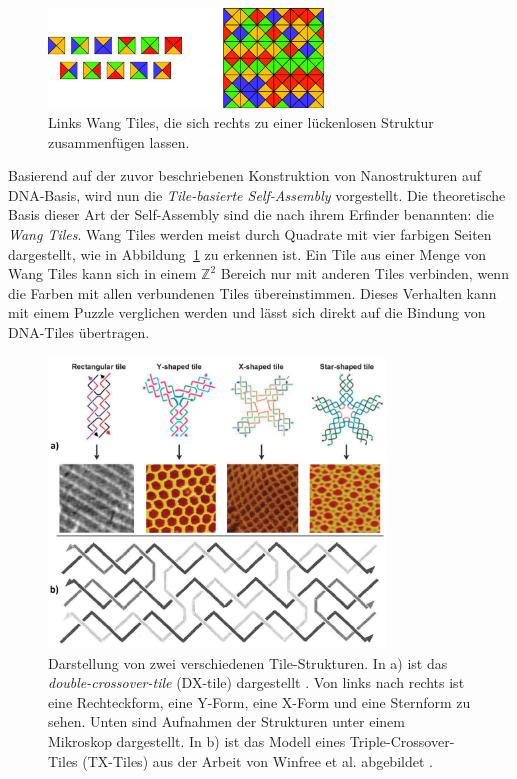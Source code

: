 \begin{figure}
	\centering
	\includegraphics[width=0.65\textwidth]{images/Wang_Tiles.png}
	\caption[Wang Tiles]{Links Wang Tiles, die sich rechts zu einer lückenlosen Struktur zusammenfügen lassen.\cite{matsushima2016verfication}}
	\label{fig:wang_tiles}
\end{figure}

Basierend auf der zuvor beschriebenen Konstruktion von Nanostrukturen auf DNA-Basis, wird nun die \emph{Tile-basierte Self-Assembly} vorgestellt. 
Die theoretische Basis dieser Art der Self-Assembly sind die nach ihrem Erfinder benannten: die \emph{Wang Tiles}. 
Wang Tiles werden meist durch Quadrate mit vier farbigen Seiten dargestellt, wie in Abbildung~\ref{fig:wang_tiles} zu erkennen ist. 
Ein Tile aus einer Menge von Wang Tiles kann sich in einem $\mathbb{Z}^2$ Bereich nur mit anderen Tiles verbinden, wenn die Farben mit allen verbundenen Tiles übereinstimmen. 
Dieses Verhalten kann mit einem Puzzle verglichen werden und lässt sich direkt auf die Bindung von DNA-Tiles übertragen.\cite{wang1990tiles}

\begin{figure}
	\centering
	\includegraphics[width=0.8\textwidth]{images/DX_TX-Tiles.png}
	\caption[DX- und TX-Tiles]{Darstellung von zwei verschiedenen Tile-Strukturen. In a) ist das \emph{double-crossover-tile} (DX-tile) dargestellt \cite{roh2011materials}. Von links nach rechts ist eine Rechteckform, eine Y-Form, eine X-Form und eine Sternform zu sehen. Unten sind Aufnahmen der Strukturen unter einem Mikroskop dargestellt. In b) ist das Modell eines Triple-Crossover-Tiles (TX-Tiles) aus der Arbeit von Winfree et al. abgebildet \cite{winfree2000tx}. }
	\label{fig:dx_tx_tiles}
\end{figure}


